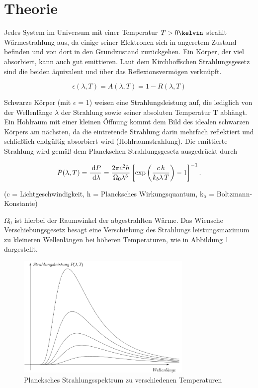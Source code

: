 
\section{Theorie}
Jedes System im Universum mit einer Temperatur $T > 0 \kelvin $ strahlt Wärmestrahlung aus, da einige seiner Elektronen sich in angeretem
Zustand befinden und von dort in den Grundzustand zurückgehen. Ein Körper, der viel absorbiert, kann auch gut emittieren. Laut dem
Kirchhoffschen Strahlungsgesetz sind die beiden äquivalent und über das Reflexionsvermögen verknüpft.

\begin{equation}
 \epsilon(\lambda,T) = A(\lambda,T) = 1 - R(\lambda,T)
 \label{Kirch}
\end{equation}


Schwarze Körper (mit $\epsilon$ = 1) weisen eine Strahlungsleistung auf, die lediglich von der Wellenlänge $\lambda$ der Strahlung sowie 
seiner absoluten Temperatur T abhängt. Ein Hohlraum mit einer kleinen Öffnung kommt dem Bild des idealen schwarzen Körpers am nächsten,
da die eintretende Strahlung darin mehrfach reflektiert und schließlich endgültig absorbiert wird (Hohlraumstrahlung). Die emittierte
Strahlung wird gemäß dem Planckschen Strahlungsgesetz ausgedrückt durch

\begin{formel}
\begin{equation}
P(\lambda,T) = \frac{\; \mathrm{d} P}{\; \mathrm{d} \lambda} = \frac{2 \pi c^2 h}{\Omega_0 \lambda^5} \left[ \exp \left(\frac{c\, h}{k_b \lambda \, T}\right) -1 \right]^{-1} .
\end{equation}
\caption*{\small{(c = Lichtgeschwindigkeit, h = Plancksches Wirkungsquantum, k$_\text{b}$ = Boltzmann-Konstante)}}
\label{Planck}
\end{formel}

$\Omega_0$ ist hierbei der Raumwinkel der abgestrahlten Wärme. Das Wiensche Verschiebungsgesetz besagt eine Verschiebung des Strahlungs
leistungsmaximum zu kleineren Wellenlängen bei höheren Temperaturen, wie in Abbildung \ref{Spektrum} dargestellt.

\begin{figure}[H]
 \includegraphics[width=0.75\textwidth]{pics/207a.png}
 \centering
 \caption{Plancksches Strahlungsspektrum zu verschiedenen Temperaturen}
 \label{Spektrum}
\end{figure}

